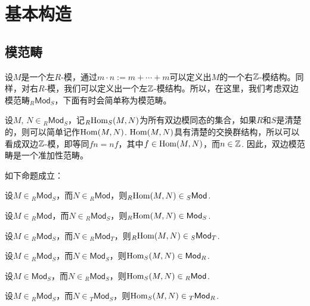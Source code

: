 \chapter{基本构造}

\section{模范畴}

设$M$是一个左$R$-模，通过$m\cdot n:=m+\cdots+m$可以定义出$M$的一个右$\mathbb{Z}$-模结构。同样，对右$R$-模，我们可以定义出一个左$\mathbb{Z}$-模结构。所以，在这里，我们考虑双边模范畴${}_R\mathsf{Mod}_S$，下面有时会简单称为模范畴。

设$M$, $N\in {}_R\mathsf{Mod}_S$，记${}_R\!\operatorname{Hom}_S(M,N)$为所有双边模同态的集合，如果$R$和$S$是清楚的，则可以简单记作$\operatorname{Hom}(M,N)$. $\operatorname{Hom}(M,N)$具有清楚的交换群结构，所以可以看成双边$\mathbb{Z}$-模，即等同$fn=nf$，其中$f\in \operatorname{Hom}(M,N)$，而$n\in \mathbb{Z}$. 因此，双边模范畴是一个准加性范畴。

\begin{lem}\label{lemmod}如下命题成立：
\begin{compactenum}[~~~(1)]
\item 设$M\in {}_R\mathsf{Mod}_S$，而$N\in {}_R\mathsf{Mod}$，则${}_R\!\operatorname{Hom}(M,N)\in {}_S\mathsf{Mod}$.
\item 设$M\in {}_R\mathsf{Mod}$，而$N\in {}_R\mathsf{Mod}_S$，则${}_R\!\operatorname{Hom}(M,N)\in \mathsf{Mod}_S$.
\item 设$M\in {}_R\mathsf{Mod}_S$，而$N\in {}_R\mathsf{Mod}_T$，则${}_R\!\operatorname{Hom}(M,N)\in {}_S\mathsf{Mod}_T$.
\item 设$M\in {}_R\mathsf{Mod}_S$，而$N\in \mathsf{Mod}_S$，则$\operatorname{Hom}_S(M,N)\in \mathsf{Mod}_R$.
\item 设$M\in \mathsf{Mod}_S$，而$N\in {}_R\mathsf{Mod}_S$，则$\operatorname{Hom}_S(M,N)\in {}_R\mathsf{Mod}$.
\item 设$M\in {}_R\mathsf{Mod}_S$，而$N\in {}_T\mathsf{Mod}_S$，则$\operatorname{Hom}_S(M,N)\in {}_T\mathsf{Mod}_R$.
\end{compactenum}
\end{lem}

